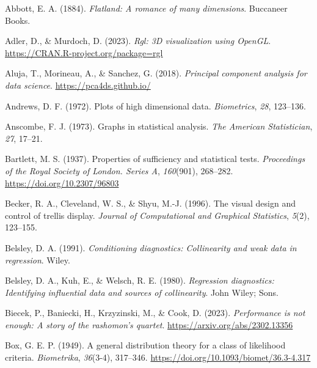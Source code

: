 \documentclass[
  letterpaper,
  10pt,
  krantz2]{krantz}
\newlength{\cslhangindent}
\newlength{\cslentryspacingunit} %
\newenvironment{CSLReferences}[2] %
 {%
  \setlength{\parindent}{0pt}
  \ifodd #1
  \let\oldpar\par
  \def\par{\hangindent=\cslhangindent\oldpar}
  \fi
  \setlength{\parskip}{#2\cslentryspacingunit}
 }%
 {}
\begin{document}
\hypertarget{refs}{}
\begin{CSLReferences}{1}{0}
\leavevmode{}%
Abbott, E. A. (1884). \emph{Flatland: A romance of many dimensions}.
Buccaneer Books.

\leavevmode{}%
Adler, D., \& Murdoch, D. (2023). \emph{Rgl: 3D visualization using
OpenGL}. \url{https://CRAN.R-project.org/package=rgl}

\leavevmode{}%
Aluja, T., Morineau, A., \& Sanchez, G. (2018). \emph{Principal
component analysis for data science}. \url{https://pca4ds.github.io/}

\leavevmode{}%
Andrews, D. F. (1972). Plots of high dimensional data.
\emph{Biometrics}, \emph{28}, 123--136.

\leavevmode{}%
Anscombe, F. J. (1973). Graphs in statistical analysis. \emph{The
American Statistician}, \emph{27}, 17--21.

\leavevmode{}%
Bartlett, M. S. (1937). Properties of sufficiency and statistical tests.
\emph{Proceedings of the Royal Society of London. Series A},
\emph{160}(901), 268--282. \url{https://doi.org/10.2307/96803}

\leavevmode{}%
Becker, R. A., Cleveland, W. S., \& Shyu, M.-J. (1996). The visual
design and control of trellis display. \emph{Journal of Computational
and Graphical Statistics}, \emph{5}(2), 123--155.

\leavevmode{}%
Belsley, D. A. (1991). \emph{Conditioning diagnostics: Collinearity and
weak data in regression}. Wiley.

\leavevmode{}%
Belsley, D. A., Kuh, E., \& Welsch, R. E. (1980). \emph{Regression
diagnostics: Identifying influential data and sources of collinearity}.
John Wiley; Sons.

\leavevmode{}%
Biecek, P., Baniecki, H., Krzyzinski, M., \& Cook, D. (2023).
\emph{Performance is not enough: A story of the rashomon's quartet}.
\url{https://arxiv.org/abs/2302.13356}

\leavevmode{}%
Box, G. E. P. (1949). A general distribution theory for a class of
likelihood criteria. \emph{Biometrika}, \emph{36}(3-4), 317--346.
\url{https://doi.org/10.1093/biomet/36.3-4.317}


\end{CSLReferences}
\end{document}
